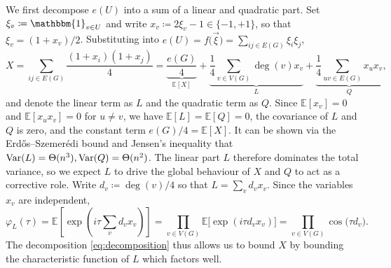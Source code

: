 We first decompose $e(U)$ into a sum of a linear and quadratic part. Set $\xi_v \coloneqq \mathbbm{1}_{v \in U}$ and write $x_v \coloneqq 2\xi_v - 1 \in \{-1, +1\}$, so that $\xi_v = (1 + x_v)/2$. Substituting into $e(U) = f\bigl(\vec\xi\bigr) = \sum_{ij \in E(G)} \xi_i \xi_j$,
\begin{equation}\label{eq:decomposition}
  X = \sum_{ij \in E(G)} \frac{(1 + x_i)(1 + x_j)}{4} = \underbrace{\frac{e(G)}{4}}_{\mathbb{E}[X]} + \underbrace{\frac{1}{4}\sum_{v \in V(G)} \deg(v) x_v}_{L} + \underbrace{\frac{1}{4}\sum_{uv \in E(G)} x_u x_v}_{Q},
\end{equation}
and denote the linear term as $L$ and the quadratic term as $Q$. Since $\mathbb{E}[x_v] = 0$ and $\mathbb{E}[x_u x_v] = 0$ for $u \ne v$, we have $\mathbb{E}[L] = \mathbb{E}[Q] = 0$, the covariance of $L$ and $Q$ is zero, and the constant term $e(G)/4 = \mathbb{E}[X]$. It can be shown via the Erd\H{o}s--Szemer\'{e}di bound and Jensen's inequality that $\operatorname{Var}(L) = \Theta(n^3), \operatorname{Var}(Q) = \Theta(n^2)$.
The linear part $L$ therefore dominates the total variance, so we expect $L$ to drive the global behaviour of $X$ and $Q$ to act as a corrective role. Write $d_v \coloneqq \deg(v)/4$ so that $L = \sum_{v} d_v x_v$. Since the variables $x_v$ are independent,
\begin{equation}
  \label{eq:phi-L}
  \varphi_L(\tau) = \mathbb{E}\left[\exp\left(i\tau\sum_v d_v x_v\right)\right] = \prod_{v \in V(G)} \mathbb{E}\bigl[\exp(i\tau d_v x_v)\bigr] = \prod_{v \in V(G)} \cos\bigl(\tau d_v\bigr). 
\end{equation}
The decomposition \eqref{eq:decomposition} thus allows us to bound $X$ by bounding the characteristic function of $L$ which factors well. 

